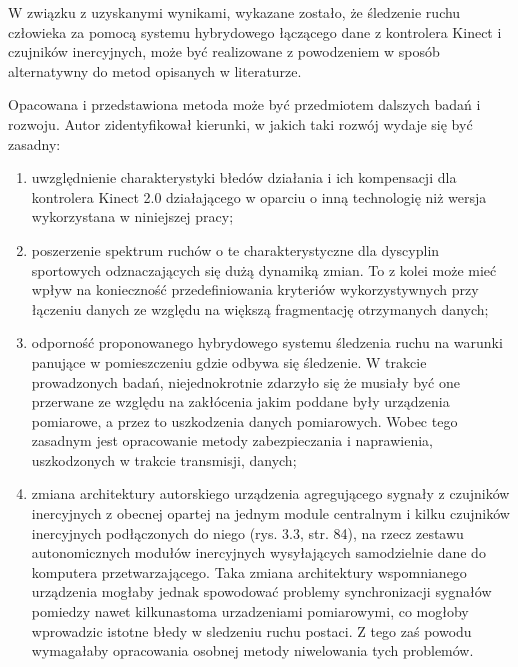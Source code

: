 \documentclass[10pt,a4paper]{article}
\begin{document}
\begin{FlushLeft}
W związku z uzyskanymi wynikami, wykazane zostało, że śledzenie ruchu człowieka za pomocą systemu hybrydowego łączącego dane z kontrolera Kinect i czujników inercyjnych, może być realizowane z powodzeniem w sposób alternatywny do metod opisanych w literaturze.

Opacowana i przedstawiona metoda może być przedmiotem dalszych badań i rozwoju. Autor zidentyfikował kierunki, w jakich taki rozwój wydaje się być zasadny:

\begin{enumerate}
	\item uwzględnienie charakterystyki błedów działania i ich kompensacji dla kontrolera Kinect 2.0 działającego w oparciu o inną technologię niż wersja wykorzystana w niniejszej pracy;
	\item poszerzenie spektrum ruchów o te charakterystyczne dla dyscyplin sportowych odznaczających się dużą dynamiką zmian. To z kolei może mieć wpływ na konieczność przedefiniowania kryteriów wykorzystywnych przy łączeniu danych ze względu na większą fragmentację otrzymanych danych;
	\item odporność proponowanego hybrydowego systemu śledzenia ruchu na warunki panujące w pomieszczeniu gdzie odbywa się śledzenie. W trakcie prowadzonych badań, niejednokrotnie zdarzyło się że musiały być one przerwane ze względu na zakłócenia jakim poddane były urządzenia pomiarowe, a przez to uszkodzenia danych pomiarowych. Wobec tego zasadnym jest opracowanie metody zabezpieczania i naprawienia, uszkodzonych w trakcie transmisji, danych;
	\item zmiana architektury autorskiego urządzenia agregującego sygnały z czujników inercyjnych z obecnej opartej na jednym module centralnym i kilku czujników inercyjnych podłączonych do niego (rys. 3.3, str. 84), na rzecz zestawu autonomicznych modułów inercyjnych wysyłających samodzielnie dane do komputera przetwarzającego. Taka zmiana architektury wspomnianego urządzenia mogłaby jednak spowodować problemy synchronizacji sygnałów pomiedzy nawet kilkunastoma urzadzeniami pomiarowymi, co mogłoby wprowadzic istotne błedy w sledzeniu ruchu postaci. Z tego zaś powodu wymagałaby opracowania osobnej metody niwelowania tych problemów.
\end{enumerate}



	\end{FlushLeft}
\end{document}
